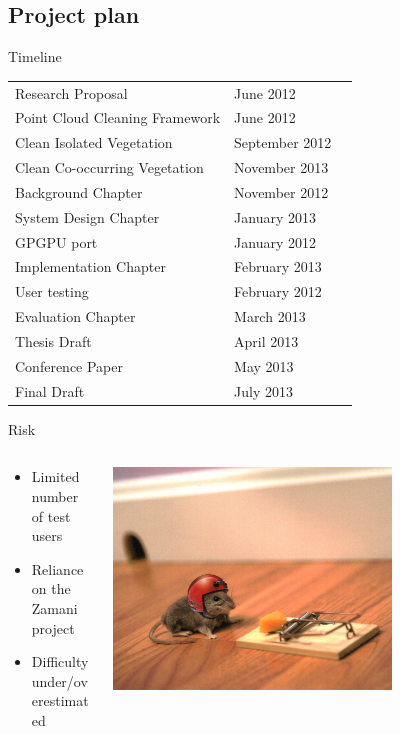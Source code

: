 \documentclass[compress]{beamer}
\begin{document}
\subsection{Project plan}
\begin{frame}{Timeline}
\begin{table}[h]
\begin{tabular}{llr}
Research Proposal & June 2012\\
Point Cloud Cleaning Framework & June 2012\\
Clean Isolated Vegetation & September 2012\\
Clean Co-occurring Vegetation & November 2013\\
Background Chapter & November 2012\\
System Design Chapter & January 2013\\
GPGPU port & January 2012\\
Implementation Chapter & February 2013\\
User testing & February 2012\\ %
Evaluation Chapter & March 2013\\
Thesis Draft & April 2013\\
Conference Paper & May 2013\\
Final Draft & July 2013\\
\end{tabular}
\end{table}
\end{frame}

\begin{frame}{Risk}
\begin{columns}[T]
\begin{column}{0.5\textwidth}
	\begin{itemize}
	    \item Limited number of test users
		\item Reliance on the Zamani project
		\item Difficulty under/overestimated
	\end{itemize}
\end{column}
\begin{column}{0.5\textwidth}
\includegraphics[width=0.7\textwidth]{pics/risk2}
\end{column}
\end{columns}
\end{frame}
\end{document}
